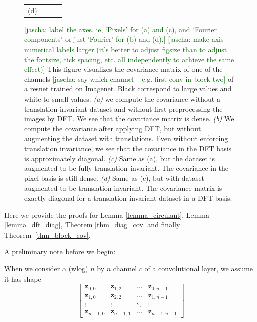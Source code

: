 \documentclass{article} %
\newcommand{\comments}[1]{#1}
\newcommand{\comments}[1]{}
\newcommand{\jcom}[1]{\comments{\textcolor{darkgreen}{[jascha: #1]}}}
\begin{document}
\begin{figure}[ht]
\begin{tabular}{cccc}
    \hspace{-\imgwidth}
        (d)
    \hspace{\imgwidth}\hspace{-\lwidth}
\end{tabular}
  \caption{
  \jcom{label the axes. ie, `Pixels' for (a) and (c), and `Fourier components' or just 'Fourier' for (b) and (d).}
    \jcom{make axis numerical labels larger (it's better to adjust figsize than to adjust the fontsize, tick spacing, etc. all independently to achieve the same effect)}  
  This figure visualizes the covariance matrix of one of the channels \jcom{say which channel -- e.g. first conv in block two} of a resnet trained on Imagenet. Black correspond to large values and white to small values. {\em (a)} we compute the covariance without a translation invariant dataset and without first preprocessing the images by DFT. We see that the covariance matrix is dense. 
   {\em (b)} We compute the covariance after applying DFT, but without augmenting the dataset with translations. Even without enforcing translation invariance, we see that the covariance in the DFT basis is approximately diagonal.
   {\em (c)} Same as (a), but the dataset is augmented to be fully translation invariant. The covariance in the pixel basis is still dense.
   {\em (d)}
   Same as (c), but with dataset augmented to be translation invariant. The covariance matrix is exactly diagonal for a translation invariant dataset in a DFT basis.}
   \label{fig-Imagenet-dft}
   \vspace*{-0.9em}
 \end{figure}


Here we provide the proofs for Lemma \ref{lemma_circulant}, Lemma \ref{lemma_dft_diag}, Theorem \ref{thm_diag_cov} and finally Theorem~\ref{thm_block_cov}.

A preliminary note before we begin:

When we consider a (wlog) $n$ by $n$ channel $c$ of a convolutional layer, we assume it has shape
\[
\begin{bmatrix}
    \pmb{z}_{0,0} & \pmb{z}_{1,2} &  \dots  & \pmb{z}_{0,n-1} \\
    \pmb{z}_{1,0} & \pmb{z}_{2,2} & \dots  & \pmb{z}_{1,n-1} \\
    \vdots & \vdots & \ddots & \vdots \\
   \pmb{z}_{n-1,0} & \pmb{z}_{n-1,1} & \dots  &\pmb{z}_{n-1,n-1}
\end{bmatrix}
\]
\end{document}
